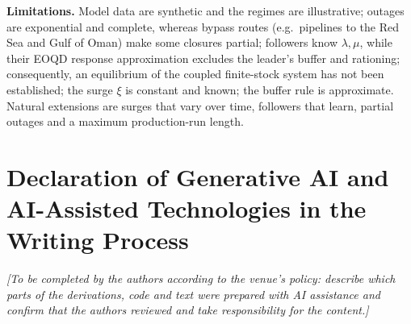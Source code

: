 \documentclass{ifacconf}
\newcommand{\rev}[1]{#1}
\begin{document}
\textbf{Limitations.} \rev{Model data are synthetic and the regimes are illustrative; outages are exponential and complete,} whereas bypass routes (e.g.\ pipelines to the Red Sea and Gulf of Oman) make some closures partial; \rev{followers know $\lambda,\mu$, while their EOQD response approximation excludes the leader's buffer and rationing; consequently, an equilibrium of the coupled finite-stock system has not been established;} the surge $\xi$ is constant and known; the buffer rule is approximate. Natural extensions are surges that vary over time, followers that learn, partial outages and a maximum production-run length.

\section*{Declaration of Generative AI and AI-Assisted Technologies in the Writing Process} \textit{[To be completed by the authors according to the venue's policy: describe which parts of the derivations, code and text were prepared with AI assistance and confirm that the authors reviewed and take responsibility for the content.]}



\end{document}
